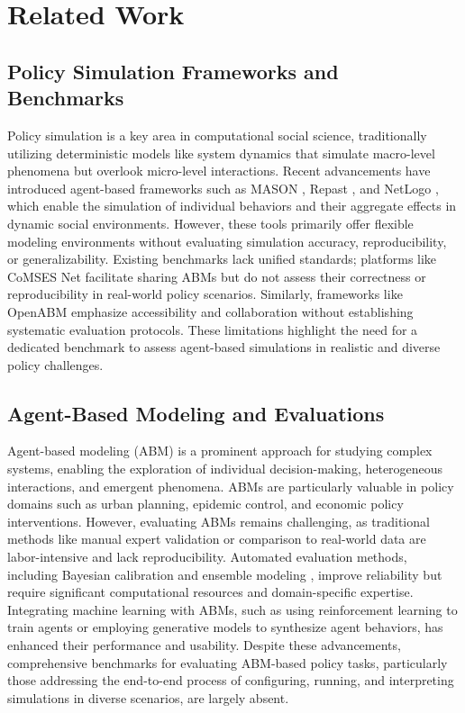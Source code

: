 \section{Related Work}
\subsection{Policy Simulation Frameworks and Benchmarks}

Policy simulation is a key area in computational social science, traditionally utilizing deterministic models like system dynamics that simulate macro-level phenomena but overlook micro-level interactions. Recent advancements have introduced agent-based frameworks such as MASON \cite{MASON}, Repast \cite{Collier2001}, and NetLogo \cite{tisue2004netlogo}, which enable the simulation of individual behaviors and their aggregate effects in dynamic social environments. However, these tools primarily offer flexible modeling environments without evaluating simulation accuracy, reproducibility, or generalizability. Existing benchmarks lack unified standards; platforms like CoMSES Net facilitate sharing ABMs but do not assess their correctness or reproducibility in real-world policy scenarios\cite{Windrum2007EmpiricalVO}. Similarly, frameworks like OpenABM emphasize accessibility and collaboration without establishing systematic evaluation protocols.\cite{Hinch2021} These limitations highlight the need for a dedicated benchmark to assess agent-based simulations in realistic and diverse policy challenges\cite{janssen2006empirically}.

\subsection{Agent-Based Modeling and Evaluations}

Agent-based modeling (ABM) is a prominent approach for studying complex systems, enabling the exploration of individual decision-making, heterogeneous interactions, and emergent phenomena. ABMs are particularly valuable in policy domains such as urban planning, epidemic control, and economic policy interventions\cite{GONZALEZMENDEZ2021105110,An2017,AN2021109685}. However, evaluating ABMs remains challenging, as traditional methods like manual expert validation or comparison to real-world data are labor-intensive and lack reproducibility. Automated evaluation methods, including Bayesian calibration\cite{thober2017, Lamperti2018} and ensemble modeling \cite{https://doi.org/10.1111/ajae.12174}, improve reliability but require significant computational resources and domain-specific expertise\cite{HUBER2018143}. Integrating machine learning with ABMs, such as using reinforcement learning to train agents or employing generative models to synthesize agent behaviors, has enhanced their performance and usability. Despite these advancements, comprehensive benchmarks for evaluating ABM-based policy tasks, particularly those addressing the end-to-end process of configuring, running, and interpreting simulations in diverse scenarios, are largely absent.